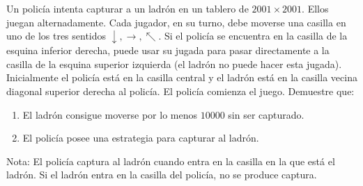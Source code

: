 Un policía intenta capturar a un ladrón en un tablero de $2001 \times 2001$. Ellos juegan alternadamente. Cada jugador, en su turno, debe moverse una casilla en uno de los tres sentidos $\downarrow, \rightarrow, \nwarrow$. \newline 
Si el policía se encuentra en la casilla de la esquina inferior derecha, puede usar su jugada para pasar directamente a la casilla de la esquina superior izquierda (el ladrón no puede hacer esta jugada). \newline 
Inicialmente el policía está en la casilla central y el ladrón está en la casilla vecina diagonal superior derecha al policía. El policía comienza el juego. Demuestre que:
 \begin{enumerate} 
   \item  El ladrón consigue moverse por lo menos $10000$ sin ser capturado.
   \item  El policía posee una estrategia para capturar al ladrón.
 \end{enumerate} 
Nota: El policía captura al ladrón cuando entra en la casilla en la que está el ladrón. Si el ladrón entra en la casilla del policía, no se produce captura.
